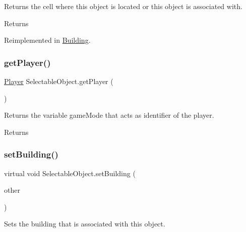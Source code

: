 Returns the cell where this object is located or this object is associated with. 

\begin{DoxyReturn}{Returns}

\end{DoxyReturn}


Reimplemented in \mbox{\hyperlink{class_building_a3e889268dc78194d5a3ae48f73067ff8}{Building}}.

\mbox{\label{class_selectable_object_a143b593a577ffb7de1edd530c677c9e6}} 
\subsubsection{\texorpdfstring{get\+Player()}{getPlayer()}}
{\footnotesize\ttfamily \mbox{\hyperlink{class_player}{Player}} Selectable\+Object.\+get\+Player (\begin{DoxyParamCaption}{ }\end{DoxyParamCaption})}



Returns the variable game\+Mode that acts as identifier of the player. 

\begin{DoxyReturn}{Returns}

\end{DoxyReturn}
\mbox{\label{class_selectable_object_a3817f94af010c5cc5d2967a145b39f21}} 
\subsubsection{\texorpdfstring{set\+Building()}{setBuilding()}}
{\footnotesize\ttfamily virtual void Selectable\+Object.\+set\+Building (\begin{DoxyParamCaption}\item[{\mbox{\hyperlink{class_selectable_object}{Selectable\+Object}}}]{other }\end{DoxyParamCaption})\hspace{0.3cm}{\ttfamily [virtual]}}



Sets the building that is associated with this object. 


